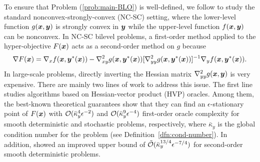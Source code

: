 \documentclass{article}
\begin{document}

To ensure that Problem (\ref{prob:main-BLO}) is well-defined, we follow \citep{ghadimi2018approximation,ji2021bilevel,hong2023two} to study the standard nonconvex-strongly-convex (NC-SC) setting, where the lower-level function $g({\bm{x}},{\bm{y}})$ is strongly convex in ${\bm{y}}$ while the upper-level function $f({\bm{x}},{\bm{y}})$ can be nonconvex.
In NC-SC bilevel problems, a first-order method applied to the 
 hyper-objective $F({\bm{x}})$ acts as a second-order method on $g$
because 
\begin{align} \label{eq:hyper-grad}
    \nabla F({\bm{x}}) = \nabla_x f({\bm{x}},{\bm{y}}^*({\bm{x}})) - \nabla_{xy}^2 g({\bm{x}},{\bm{y}}^*({\bm{x}})) [ \nabla_{yy}^2 g({\bm{x}},{\bm{y}}^*({\bm{x}}))]^{-1} \nabla_y f({\bm{x}},{\bm{y}}^*({\bm{x}})).
\end{align}
In large-scale problems, directly inverting the Hessian matrix $\nabla_{yy}^2 g({\bm{x}},{\bm{y}})$ is very expensive. There are mainly two lines of work to address this issue. 
The first line studies algorithms based on Hessian-vector product (HVP) oracles. Among them, the best-known 
theoretical guarantees \citep{ji2021bilevel,arbel2022amortized} show that they
can find an $\epsilon$-stationary point of $F({\bm{x}})$ with ${\mathcal{O}}(\bar \kappa_y^{4} \epsilon^{-2})$ and ${\mathcal{O}}(\bar \kappa_y^9 \epsilon^{-4})$  first-order oracle complexity for smooth deterministic and stochastic problems, respectively, 
where $\bar \kappa_y$ is the global condition number for the problem (see Definition~\ref{dfn:cond-number}). In addition,
\citet{yang2023accelerating} showed an improved upper bound of $\tilde {{\mathcal{O}}}(\bar \kappa_y^{13/4} \epsilon^{-7/4})$ for second-order smooth deterministic problems.

\end{document}
